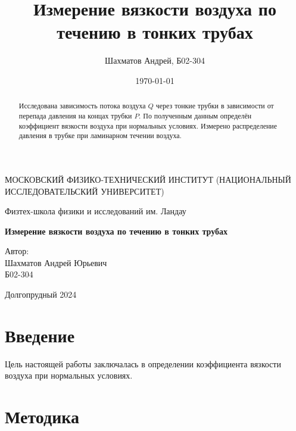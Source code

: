 \documentclass[12pt]{article}
\title{Измерение вязкости воздуха по течению в тонких трубах}
\author{Шахматов Андрей, Б02-304}
\date{\today}
\begin{document}
\begin{titlepage}
    \begin{center}
        {\large МОСКОВСКИЙ ФИЗИКО-ТЕХНИЧЕСКИЙ ИНСТИТУТ (НАЦИОНАЛЬНЫЙ ИССЛЕДОВАТЕЛЬСКИЙ УНИВЕРСИТЕТ)}
    \end{center}
    \begin{center}
        {\large Физтех-школа физики и исследований им. Ландау}
    \end{center}
    
    
    \vspace{3cm}
    {\huge
        \begin{center}
            \textbf{Измерение вязкости воздуха по течению в тонких трубах}
        \end{center}
    }
    \vspace{2cm}
    \begin{flushright}
        {\LARGE Автор:\\ Шахматов Андрей Юрьевич \\
            \vspace{0.2cm}
            Б02-304}
    \end{flushright}
    \vspace{7 cm}
    \begin{center}
        Долгопрудный 2024
    \end{center}
\end{titlepage}


\begin{abstract}
    Исследована зависимость потока воздуха $Q$ через тонкие трубки в зависимости от перепада давления 
    на концах трубки $P$. По полученным данным определён коэффициент вязкости воздуха при нормальных условиях. 
    Измерено распределение давления в трубке при ламинарном течении воздуха.      
\end{abstract}

\tableofcontents

\section{Введение}
Цель настоящей работы заключалась в определении коэффициента вязкости воздуха при нормальных условиях.

\section{Методика}
\end{document}
